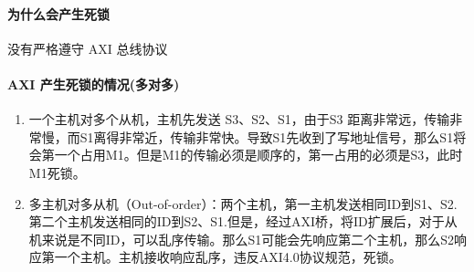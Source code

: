 \paragraph{为什么会产生死锁}
没有严格遵守 AXI 总线协议
\paragraph{AXI 产生死锁的情况(多对多)}
\begin{enumerate}
    \item 一个主机对多个从机，主机先发送 S3、S2、S1，由于S3 距离非常远，传输非常慢，而S1离得非常近，传输非常快。导致S1先收到了写地址信号，那么S1将会第一个占用M1。但是M1的传输必须是顺序的，第一占用的必须是S3，此时M1死锁。
    \item 多主机对多从机（Out-of-order）：两个主机，第一主机发送相同ID到S1、S2.第二个主机发送相同的ID到S2、S1.但是，经过AXI桥，将ID扩展后，对于从机来说是不同ID，可以乱序传输。那么S1可能会先响应第二个主机，那么S2响应第一个主机。主机接收响应乱序，违反AXI4.0协议规范，死锁。
\end{enumerate}